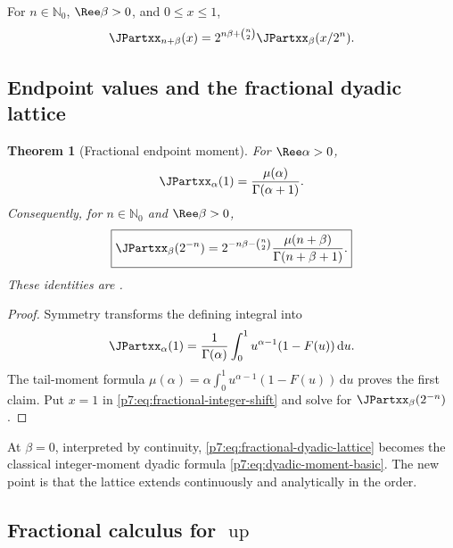 \documentclass[11pt,oneside]{article}
\newtheorem{theorem}{Theorem}[section]
\theoremstyle{definition}
\theoremstyle{remark}
\newcommand{\Up}{\operatorname{up}}
\newcommand{\N}{\mathbb N}
\newcommand{\dd}{\,\mathrm d}
\newcommand{\1}{\mathbf 1}
\begin{document}
\begin{corollary}
\label{p7:cor:fractional-integer-shift}
For $n\in\N_0$, $\Ree\beta>0$, and $0\le x\le1$,
\begin{equation}
 \JPartxx_{n+\beta}(x)
 =2^{n\beta+\binom n2}\JPartxx_\beta(x/2^n).
 \label{p7:eq:fractional-integer-shift}
\end{equation}
\end{corollary}

\subsection{Endpoint values and the fractional dyadic lattice}

\begin{theorem}[Fractional endpoint moment]
\label{p7:thm:fractional-endpoint}
For $\Ree\alpha>0$,
\begin{equation}
 \JPartxx_\alpha(1)=\frac{\mu(\alpha)}{\Gamma(\alpha+1)}.
 \label{p7:eq:fractional-endpoint}
\end{equation}
Consequently, for $n\in\N_0$ and $\Ree\beta>0$,
\begin{equation}
 \boxed{
 \JPartxx_\beta(2^{-n})
 =2^{-n\beta-\binom n2}
 \frac{\mu(n+\beta)}{\Gamma(n+\beta+1)}.}
 \label{p7:eq:fractional-dyadic-lattice}
\end{equation}
These identities are \statusproved.
\end{theorem}

\begin{proof}
Symmetry transforms the defining integral into
\[
 \JPartxx_\alpha(1)=\frac1{\Gamma(\alpha)}\int_0^1u^{\alpha-1}(1-F(u))\dd u.
\]
The tail-moment formula
$\mu(\alpha)=\alpha\int_0^1u^{\alpha-1}(1-F(u))\dd u$ proves the first claim.  Put $x=1$ in
\cref{p7:eq:fractional-integer-shift} and solve for $\JPartxx_\beta(2^{-n})$.
\end{proof}

\begin{remark}
At $\beta=0$, interpreted by continuity, \cref{p7:eq:fractional-dyadic-lattice} becomes the
classical integer-moment dyadic formula \cref{p7:eq:dyadic-moment-basic}.  The new point is that
the lattice extends continuously and analytically in the order.
\end{remark}

\subsection{Fractional calculus for $\Up$}
\end{document}
